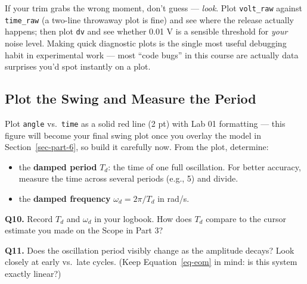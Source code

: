 \documentclass[
  12pt,
  letterpaper,
]{article}
\providecommand{\tightlist}{%
  \setlength{\itemsep}{0pt}\setlength{\parskip}{0pt}}
\begin{document}
\begin{tcolorbox}[enhanced jigsaw, arc=.35mm, bottomrule=.15mm, bottomtitle=1mm, breakable, colback=white, colbacktitle=quarto-callout-tip-color!10!white, colframe=quarto-callout-tip-color-frame, coltitle=black, left=2mm, leftrule=.75mm, opacityback=0, opacitybacktitle=0.6, rightrule=.15mm, title=\textcolor{quarto-callout-tip-color}{\faLightbulb}\hspace{0.5em}{Debug it yourself}, titlerule=0mm, toprule=.15mm, toptitle=1mm]

If your trim grabs the wrong moment, don't guess --- \emph{look}. Plot
\texttt{volt\_raw} against \texttt{time\_raw} (a two-line throwaway plot
is fine) and see where the release actually happens; then plot
\texttt{dv} and see whether 0.01 V is a sensible threshold for
\emph{your} noise level. Making quick diagnostic plots is the single
most useful debugging habit in experimental work --- most ``code bugs''
in this course are actually data surprises you'd spot instantly on a
plot.

\end{tcolorbox}

\subsection{Plot the Swing and Measure the
Period}\label{plot-the-swing-and-measure-the-period}

Plot \texttt{angle} vs.~\texttt{time} as a solid red line (2 pt) with
Lab 01 formatting --- this figure will become your final swing plot once
you overlay the model in Section~\ref{sec-part-6}, so build it carefully
now. From the plot, determine:

\begin{itemize}
\tightlist
\item
  the \textbf{damped period} \(T_d\): the time of one full oscillation.
  For better accuracy, measure the time across several periods (e.g., 5)
  and divide.
\item
  the \textbf{damped frequency} \(\omega_d = 2\pi / T_d\) in rad/s.
\end{itemize}

\begin{tcolorbox}[enhanced jigsaw, arc=.35mm, bottomrule=.15mm, bottomtitle=1mm, breakable, colback=white, colbacktitle=quarto-callout-important-color!10!white, colframe=quarto-callout-important-color-frame, coltitle=black, left=2mm, leftrule=.75mm, opacityback=0, opacitybacktitle=0.6, rightrule=.15mm, title=\textcolor{quarto-callout-important-color}{\faExclamation}\hspace{0.5em}{Logbook Questions}, titlerule=0mm, toprule=.15mm, toptitle=1mm]

\textbf{Q10.} Record \(T_d\) and \(\omega_d\) in your logbook. How does
\(T_d\) compare to the cursor estimate you made on the Scope in Part 3?

\textbf{Q11.} Does the oscillation period visibly change as the
amplitude decays? Look closely at early vs.~late cycles. (Keep
Equation~\ref{eq-eom} in mind: is this system exactly linear?)

\end{tcolorbox}
\end{document}
